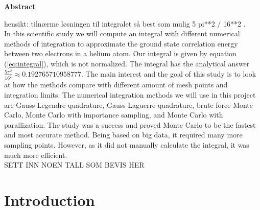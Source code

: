 \documentclass{article}
\begin{document}
\vspace{1cm}


\begin{center}

{\Large\textbf{Abstract}} \label{sec:Abstract}

\end{center}

\vspace{5mm}

hensikt: tilnærme løsningen til integralet så best som mulig 5 pi**2 / 16**2 . \\

In this scientific study we will compute an integral with different numerical methods of integration to approximate the ground state correlation energy between two electrons in a helium atom. Our integral is given by equation (\ref{eq:integral}), which is not normalized. The integral has the analytical answer $\frac{5 \pi^2}{16^2} \approx 0.192765710958777$. The main interest and the goal of this study is to look at how the methods compare with different amount of mesh points and integration limits. The numerical integration methods we will use in this project are Gauss-Legendre quadrature, Gauss-Laguerre quadrature, brute force Monte Carlo, Monte Carlo with importance sampling, and Monte Carlo with parallization. The study was a success and proved Monte Carlo to be the fastest and most accurate method. Being based on big data, it required many more sampling points. However, as it did not manually calculate the integral, it was much more efficient. \\

SETT INN NOEN TALL SOM BEVIS HER



\newpage


\vspace{1cm}

\tableofcontents

\vspace{1cm}

\vspace{1cm}

\section{Introduction} \label{sec:Introduction}
\end{document}
